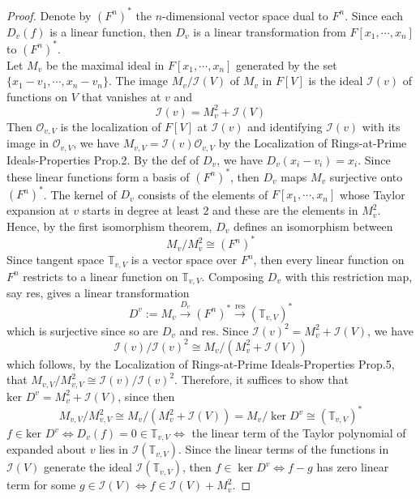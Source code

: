 \begin{proof}
    Denote by $(F^n)^*$ the $n$-dimensional vector space dual to $F^n$. Since each $D_v(f)$ is a linear function, then $D_v$ is a linear transformation from $F[x_1 ,\cdots, x_n]$ to $(F^n)^*$.\\
    Let $M_v$ be the maximal ideal in $F[x_1 ,\cdots, x_n]$ generated by the set $\{ x_1 -v_1 ,\cdots, x_n-v_n\}$. The image $M_v /\mathcal{I}(V)$ of $M_v$ in $F[V]$ is the ideal $\mathcal{I} (v)$ of functions on $V$ that vanishes at $v$ and 
    $$\mathcal{I} (v) = M_v^2+\mathcal{I} (V)$$
    Then $\mathcal{O}_{v,V}$ is the localization of $F[V]$ at $\mathcal{I}(v)$ and identifying $\mathcal{I} (v)$ with its image in $\mathcal{O}_{v,V}$, we have $M_{v,V}= \mathcal{I}(v) \mathcal{O}_{v,V}$ by the Localization of Rings-at-Prime Ideals-Properties Prop.2. By the def of $D_v$, we have $D_v(x_i-v_i)= x_i$. Since these linear functions form a basis of $(F^n)^*$, then $D_v$ maps $M_v$ surjective onto $(F^n)^*$. The kernel of $D_v$ consists of the elements of $F[x_1 ,\cdots, x_n]$ whose Taylor expansion at $v$ starts in degree at least $2$ and these are the elements in $M_v^2$. Hence, by the first isomorphism theorem, $D_v$ defines an isomorphism between
    $$M_v /M_v^2 \cong (F^n)^*$$
    Since tangent space $\mathbb{T}_{v,V}$ is a vector space over $F^n$, then every linear function on $F^n$ restricts to a linear function on $\mathbb{T}_{v,V}$. Composing $D_v$ with this restriction map, say res, gives a linear transformation
    $$D^v:= M_v \overset{D_v}{\to} (F^n)^* \overset{\text{res}}{\to} (\mathbb{T}_{v,V})^*$$
    which is surjective since so are $D_v$ and res. Since $\mathcal{I} (v)^2= M_v^2+ \mathcal{I} (V)$, we have
    \[
    \mathcal{I} (v)/ \mathcal{I} (v)^2 \cong M_v /(M_v^2 + \mathcal{I} (V))
    \]
    which follows, by the Localization of Rings-at-Prime Ideals-Properties Prop.5, that $M_{v,V}/M_{v,V}^2 \cong \mathcal{I} (v)/ \mathcal{I} (v)^2$. Therefore, it suffices to show that $\text{ker }D^v= M_v^2 +\mathcal{I} (V)$, since then
    $$M_{v,V}/M_{v,V}^2 \cong M_v/ (M_v^2+\mathcal{I} (V)) = M_v/\ker D^v \cong (\mathbb{T} _{v,V})^*$$
    $f \in \text{ker }D^v \Leftrightarrow D_v(f) =0 \in \mathbb{T}_{v,V} \Leftrightarrow$ the linear term of the Taylor polynomial of expanded about $v$ lies in $\mathcal{I} (\mathbb{T}_{v,V})$. Since the linear terms of the functions in $\mathcal{I} (V)$ generate the ideal $\mathcal{I}(\mathbb{T}_{v,V})$, then $f \in \ker D^v \Leftrightarrow f-g$ has zero linear term for some $g \in \mathcal{I} (V) \Leftrightarrow f\in \mathcal{I} (V) +M_v^2$.
\end{proof}


